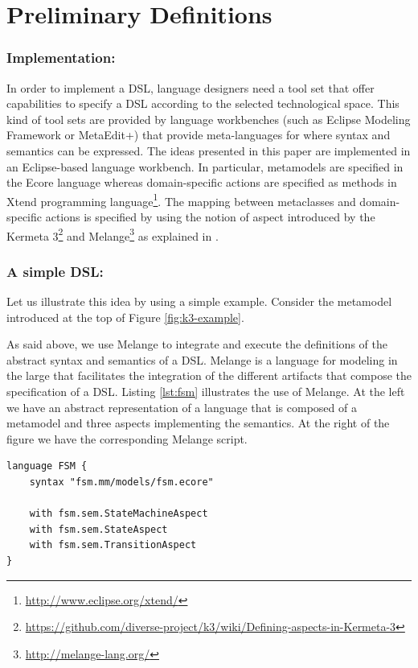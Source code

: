 \section{Preliminary Definitions}
\label{sec:background}



\vspace{-3mm}
\subsubsection{Implementation:} In order to implement a DSL, language designers need a tool set that offer capabilities to specify a DSL according to the selected technological space. This kind of tool sets are provided by language workbenches (such as Eclipse Modeling Framework or MetaEdit+) that provide meta-languages for where syntax and semantics can be expressed. The ideas presented in this paper are implemented in an Eclipse-based language workbench. In particular, metamodels are specified in the Ecore language whereas domain-specific actions are specified as methods in Xtend programming language\footnote{\url{http://www.eclipse.org/xtend/}}. The mapping between metaclasses and domain-specific actions is specified by using the notion of aspect introduced by the Kermeta 3\footnote{\url{https://github.com/diverse-project/k3/wiki/Defining-aspects-in-Kermeta-3}} and Melange\footnote{\url{http://melange-lang.org/}} as explained in \cite{degueule:2015}. 

\subsubsection{A simple DSL:} Let us illustrate this idea by using a simple example. Consider the metamodel introduced at the top of Figure \ref{fig:k3-example}.

As said above, we use Melange to integrate and execute the definitions of the abstract syntax and semantics of a DSL. Melange is a language for modeling in the large that facilitates the integration of the different artifacts that compose the specification of a DSL. Listing \ref{lst:fsm} illustrates the use of Melange. At the left we have an abstract representation of a language that is composed of a metamodel and three aspects implementing the semantics. At the right of the figure we have the corresponding Melange script.
 
\vspace{4mm}
\begin{lstlisting}[caption=Melange script for a simple FSM language, label=lst:fsm]
language FSM {
    syntax "fsm.mm/models/fsm.ecore"
    
    with fsm.sem.StateMachineAspect
    with fsm.sem.StateAspect
    with fsm.sem.TransitionAspect
}
\end{lstlisting}

